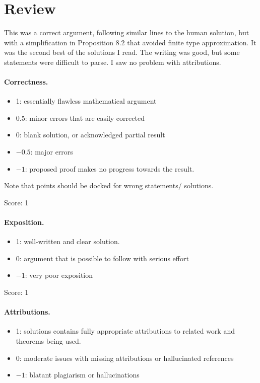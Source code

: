 \documentclass[11pt]{article}
\theoremstyle{definition}
\theoremstyle{remark}
\begin{document}
\maketitle

\section{Review}

This was a correct argument, following similar lines to the human solution, but with a simplification in Proposition 8.2 that avoided finite type approximation.  It was the second best of the solutions I read.  The writing was good, but some statements were difficult to parse.  I saw no problem with attributions.


\paragraph{Correctness.}
\begin{itemize}
	\item  1: essentially flawless mathematical argument
	\item  0.5: minor errors that are easily corrected
	\item  0: blank solution, or acknowledged partial result
	\item  $-0.5$: major errors
	\item  $-1$: proposed proof makes no progress towards the result.
\end{itemize}
Note that points should be docked for wrong statements/ solutions.

\noindent Score: 1

\paragraph{Exposition.}
\begin{itemize}
	\item  1: well-written and clear solution.
	\item  0: argument that is possible to follow with serious effort
	\item  $-1$: very poor exposition
\end{itemize}

\noindent Score: 1

\paragraph{Attributions.}
\begin{itemize}
	\item  1: solutions contains fully appropriate attributions
		to related work and theorems being used.
	\item  0: moderate issues with missing attributions or hallucinated references
	\item  $-1$: blatant plagiarism or hallucinations
\end{itemize}
\end{document}
